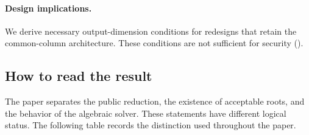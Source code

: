 \documentclass[11pt]{article}
\begin{document}
\paragraph{Design implications.}
We derive necessary output-dimension conditions for redesigns that retain the
common-column architecture.  These conditions are not sufficient for security
().

\subsection{How to read the result}

The paper separates the public reduction, the existence of acceptable roots,
and the behavior of the algebraic solver.  These statements have different
logical status.  The following table records the distinction used throughout
the paper.
\end{document}
